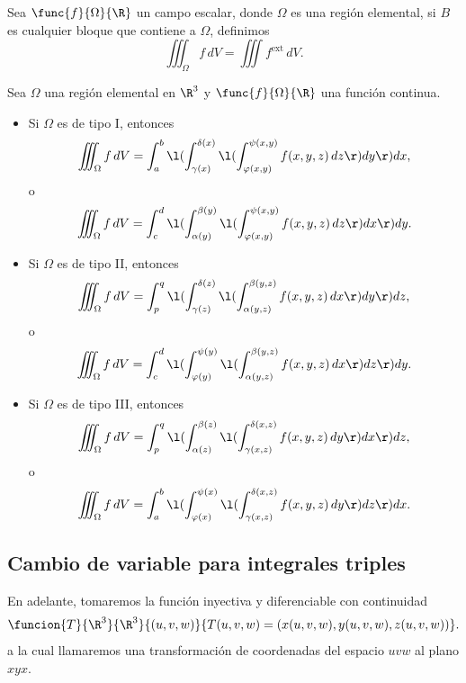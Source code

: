 \documentclass[a4,11pt]{aleph-notas}
\begin{document}
\begin{defi}
    Sea $\func{f}{\Omega}{\R}$ un campo escalar, donde $\Omega$ es una región elemental, si $B$ es cualquier bloque que contiene a $\Omega$, definimos
    \[
        \iiint_\Omega f\, dV = \iiint f^{\text{ext}}\, dV.
    \]
\end{defi}
   
\begin{prop}
    Sea $\Omega$ una región elemental en $\R^3$ y $\func{f}{\Omega}{\R}$ una función continua.
    \begin{itemize}
        \item Si $\Omega$ es de tipo I, entonces
        \[
            \iiint_\Omega f\, dV = \int_a^b \l(\int_{\gamma(x)}^{\delta(x)} \l(\int_{\varphi(x,y)}^{\psi(x,y)} f(x,y,z)\, dz\r)dy\r)dx,
        \]
        o
        \[
            \iiint_\Omega f\, dV = \int_c^d \l(\int_{\alpha(y)}^{\beta(y)} \l(\int_{\varphi(x,y)}^{\psi(x,y)} f(x,y,z)\, dz\r)dx\r)dy.
        \]
        
        \item Si $\Omega$ es de tipo II, entonces
        \[
            \iiint_\Omega f\, dV = \int_p^q \l(\int_{\gamma(z)}^{\delta(z)} \l(\int_{\alpha(y,z)}^{\beta(y,z)} f(x,y,z)\, dx\r)dy\r)dz,
        \]
        o
        \[
            \iiint_\Omega f\, dV = \int_c^d \l(\int_{\varphi(y)}^{\psi(y)} \l(\int_{\alpha(y,z)}^{\beta(y,z)} f(x,y,z)\, dx\r)dz\r)dy.
        \] 
        
        \item Si $\Omega$ es de tipo III, entonces
        \[
            \iiint_\Omega f\, dV = \int_p^q \l(\int_{\alpha(z)}^{\beta(z)} \l(\int_{\gamma(x,z)}^{\delta(x,z)} f(x,y,z)\, dy\r)dx\r)dz,
        \]
        o
        \[
            \iiint_\Omega f\, dV = \int_a^b \l(\int_{\varphi(x)}^{\psi(x)} \l(\int_{\gamma(x,z)}^{\delta(x,z)} f(x,y,z)\, dy\r)dz\r)dx.
        \]
    \end{itemize}
\end{prop}

\subsection{Cambio de variable para integrales triples}

En adelante, tomaremos la función inyectiva y diferenciable con continuidad
\[
    \funcion{T}{\R^3}{\R^3}{(u,v,w)}{T(u,v,w)=(x(u,v,w),y(u,v,w),z(u,v,w))}.
\]
a la cual llamaremos una transformación de coordenadas del espacio $uvw$ al plano $xyx$.
\end{document}
